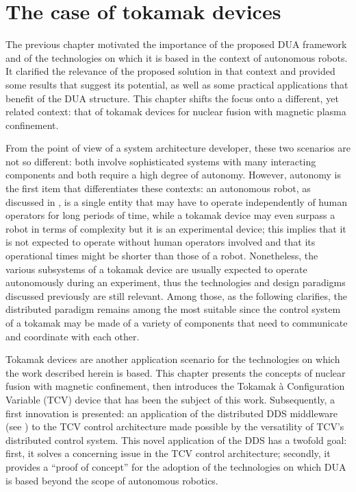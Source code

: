 \chapter{The case of tokamak devices}
\label{ch:tokamaks}
\vspace{-1.3cm}

The previous chapter motivated the importance of the proposed DUA framework and of the technologies on which it is based in the context of autonomous robots. It clarified the relevance of the proposed solution in that context and provided some results that suggest its potential, as well as some practical applications that benefit of the DUA structure. This chapter shifts the focus onto a different, yet related context: that of tokamak devices for nuclear fusion with magnetic plasma confinement.

From the point of view of a system architecture developer, these two scenarios are not so different: both involve sophisticated systems with many interacting components and both require a high degree of autonomy. However, autonomy is the first item that differentiates these contexts: an autonomous robot, as discussed in , is a single entity that may have to operate independently of human operators for long periods of time, while a tokamak device may even surpass a robot in terms of complexity but it is an experimental device; this implies that it is not expected to operate without human operators involved and that its operational times might be shorter than those of a robot. Nonetheless, the various subsystems of a tokamak device are usually expected to operate autonomously during an experiment, thus the technologies and design paradigms discussed previously are still relevant. Among those, as the following clarifies, the distributed paradigm remains among the most suitable since the control system of a tokamak may be made of a variety of components that need to communicate and coordinate with each other.

Tokamak devices are another application scenario for the technologies on which the work described herein is based. This chapter presents the concepts of nuclear fusion with magnetic confinement, then introduces the Tokamak à Configuration Variable (TCV) device that has been the subject of this work. Subsequently, a first innovation is presented: an application of the distributed DDS middleware (see ) to the TCV control architecture made possible by the versatility of TCV's distributed control system. This novel application of the DDS has a twofold goal: first, it solves a concerning issue in the TCV control architecture; secondly, it provides a ``proof of concept'' for the adoption of the technologies on which DUA is based beyond the scope of autonomous robotics.




